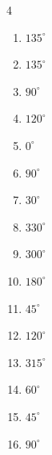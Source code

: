 \begin{multicols}{4}
\begin{enumerate}
  \item $\displaystyle 135^{\circ}$

  \item $\displaystyle 135^{\circ}$

  \item $\displaystyle 90^{\circ}$

  \item $\displaystyle 120^{\circ}$

\columnbreak %

  \item $\displaystyle 0^{\circ}$
        \phantom{$\displaystyle =0$}

  \item $\displaystyle 90^{\circ}$

  \item $\displaystyle 30^{\circ}$

  \item $\displaystyle 330^{\circ}$

  \item $\displaystyle 300^{\circ}$

  \item $\displaystyle 180^{\circ}$
        \phantom{$\displaystyle =\pi$}

  \item $\displaystyle 45^{\circ}$

  \item $\displaystyle 120^{\circ}$

  \item $\displaystyle 315^{\circ}$

  \item $\displaystyle 60^{\circ}$

  \item $\displaystyle 45^{\circ}$

  \item $\displaystyle 90^{\circ}$


\end{enumerate}
\end{multicols}
